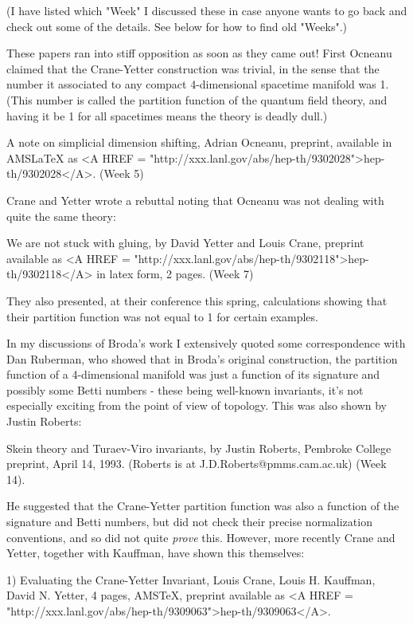 (I have listed which "Week" I discussed these in case anyone wants to go
back and check out some of the details.   See below for how to find old
"Weeks".)  

These papers ran into stiff opposition as soon as they came out!  First
Ocneanu claimed that the Crane-Yetter construction was trivial, in the
sense that the number it associated to any compact 4-dimensional
spacetime manifold was 1.  (This number is called the partition function
of the quantum field theory, and having it be 1 for all spacetimes means
the theory is deadly dull.)  

A note on simplicial dimension shifting, Adrian Ocneanu, preprint,
available in AMSLaTeX as <A HREF = "http://xxx.lanl.gov/abs/hep-th/9302028">hep-th/9302028</A>.   (Week 5)

Crane and Yetter wrote a rebuttal noting that Ocneanu was not dealing
with quite the same theory:

We are not stuck with gluing, by David Yetter and Louis Crane, preprint
available as <A HREF = "http://xxx.lanl.gov/abs/hep-th/9302118">hep-th/9302118</A> in latex form, 2 pages.   (Week 7)

They also presented, at their conference this spring, calculations
showing that their partition function was not equal to 1 for certain
examples.

In my discussions of Broda's work I extensively quoted some
correspondence with Dan Ruberman, who showed that in Broda's original
construction, the partition function of a 4-dimensional manifold was
just a function of its signature and possibly some Betti numbers - these
being well-known invariants, it's not especially exciting from the point
of view of topology.   This was also shown by Justin Roberts:

Skein theory and Turaev-Viro invariants, by Justin Roberts, Pembroke
College preprint, April 14, 1993.  (Roberts is at J.D.Roberts@pmms.cam.ac.uk)
(Week 14).

He suggested that the Crane-Yetter partition function was also a
function of the signature and Betti numbers, but did not check their
precise normalization conventions, and so did not quite \emph{prove} this.
However, more recently Crane and Yetter, together with Kauffman, have
shown this themselves:

1)  Evaluating the Crane-Yetter Invariant, Louis Crane, Louis H. Kauffman,
David N. Yetter, 4 pages, AMSTeX, preprint available as <A HREF = "http://xxx.lanl.gov/abs/hep-th/9309063">hep-th/9309063</A>.

